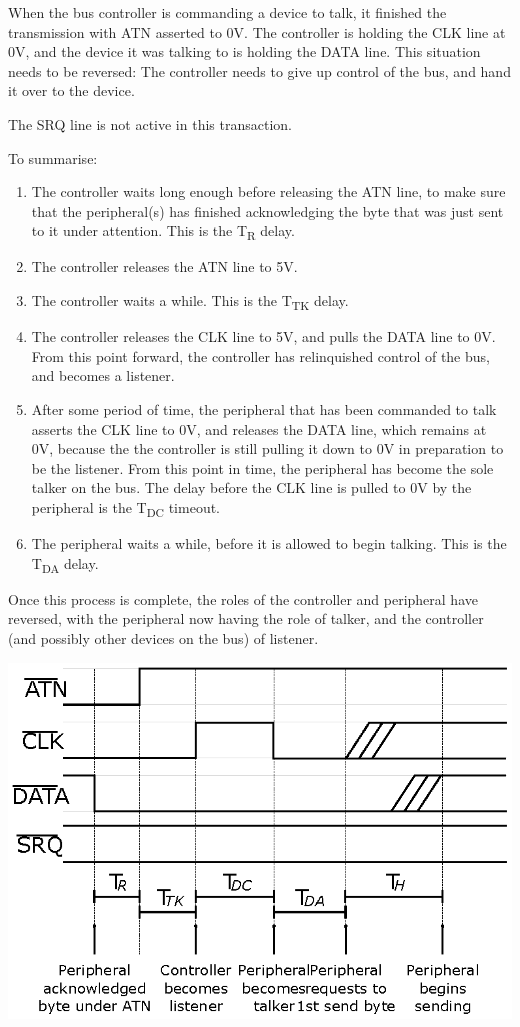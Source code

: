 When the bus controller is commanding a device to talk, it finished
the transmission with ATN asserted to 0V.  The controller is holding
the CLK line at 0V, and the device it was talking to is holding the
DATA line.  This situation needs to be reversed: The controller needs
to give up control of the bus, and hand it over to the device.

The SRQ line is not active in this transaction.

To summarise:

\begin{enumerate}
\item The controller waits long enough before releasing the
ATN line, to make sure that the peripheral(s) has finished acknowledging the
byte that was just sent to it under attention. This is the T\textsubscript{R} delay.
\item The controller releases the ATN line to 5V.
\item The controller waits a while. This is the T\textsubscript{TK} delay.
\item The controller releases the CLK line to 5V, and pulls the DATA
  line to 0V. From this point
  forward, the controller has relinquished control of the bus, and
  becomes a listener.
\item After some period of time, the peripheral that has been
  commanded to talk asserts the CLK line to 0V, and releases the DATA
  line, which remains at 0V, because the the controller is still
  pulling it down to 0V in preparation to be the listener.
  From this point
  in time, the peripheral has become the sole talker on the
  bus. The delay before the CLK line is pulled to 0V by the
  peripheral is the T\textsubscript{DC} timeout.
\item The peripheral waits a while, before it is allowed to
  begin talking. This is the T\textsubscript{DA} delay.
\end{enumerate}

Once this process is complete, the roles of the controller and
peripheral have reversed, with the peripheral now having the role of
talker, and the controller (and possibly other devices on the bus) of
listener.

\begin{center}
\includegraphics{images/IEC-Timing-Diagrams/IEC-Timing-Diagram-TurnAround}
\end{center}

